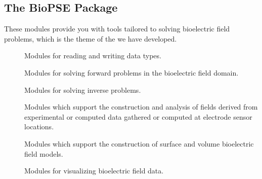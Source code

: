 \subsection{The BioPSE Package}
\label{sec:biopsepackage}


These modules provide you with tools tailored to solving bioelectric field
problems, which is the theme of the  we have developed.


\begin{description}
\item[] Modules for reading and writing \sr{} data types.
\item[] Modules for solving forward
  problems in the bioelectric field domain.
\item[] Modules for solving inverse problems.
\item[] Modules which support the
  construction and analysis of fields derived from experimental or
  computed data gathered or computed at electrode sensor locations.
\item[] Modules which support the construction of
  surface and volume bioelectric field models.
\item[] Modules for visualizing bioelectric
  field data.
\end{description}

